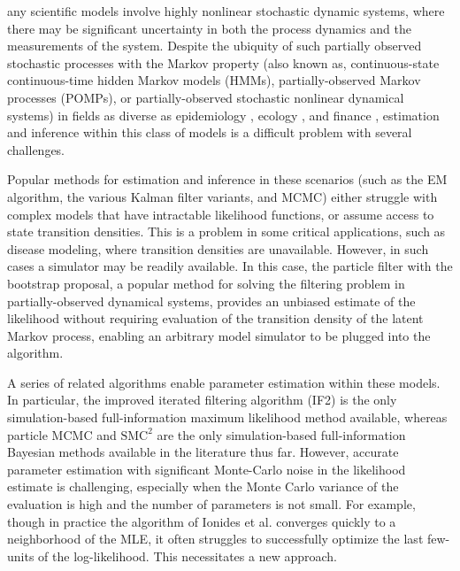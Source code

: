 \documentclass[9pt,twocolumn,twoside]{pnas-new}
\begin{document}
any scientific models involve highly nonlinear stochastic dynamic systems, where there may be significant uncertainty in both the process dynamics and the measurements of the system. Despite the ubiquity of such partially observed stochastic processes with the Markov property (also known as, continuous-state continuous-time hidden Markov models (HMMs), partially-observed Markov processes (POMPs), or partially-observed stochastic nonlinear dynamical systems) in fields as diverse as epidemiology \cite{he10, stocks17}, ecology \cite{knape12}, and finance \cite{kim08, breto14}, estimation and inference within this class of models is a difficult problem with several challenges. 

Popular methods for estimation and inference in these scenarios (such as the EM algorithm, the various Kalman filter variants, and MCMC) either struggle with complex models that have intractable likelihood functions, or assume access to state transition densities. This is a problem in some critical applications, such as disease modeling, where transition densities are unavailable. However, in such cases a simulator may be readily available. In this case, the particle filter with the bootstrap proposal, a popular method for solving the filtering problem in partially-observed dynamical systems, provides an unbiased estimate of the likelihood \cite{delmoral2004feynman} without requiring evaluation of the transition density of the latent Markov process, enabling an arbitrary model simulator to be plugged into the algorithm. 

A series of related algorithms \cite{welch2009abc, wood2010sl, doucet2010pmcmc, ionides08, ionides15} enable parameter estimation within these models. In particular, the improved iterated filtering algorithm (IF2) \cite{ionides15} is the only simulation-based full-information maximum likelihood method available, whereas particle MCMC \cite{doucet2010pmcmc} and $\text{SMC}^2$ \cite{chopin13} are the only simulation-based full-information Bayesian methods available in the literature thus far. However, accurate parameter estimation with significant Monte-Carlo noise in the likelihood estimate is challenging, especially when the Monte Carlo variance of the evaluation is high and the number of parameters is not small. For example, though in practice the algorithm of Ionides et al. \cite{ionides15} converges quickly to a neighborhood of the MLE, it often struggles to successfully optimize the last few-units of the log-likelihood. This necessitates a new approach.
\end{document}

